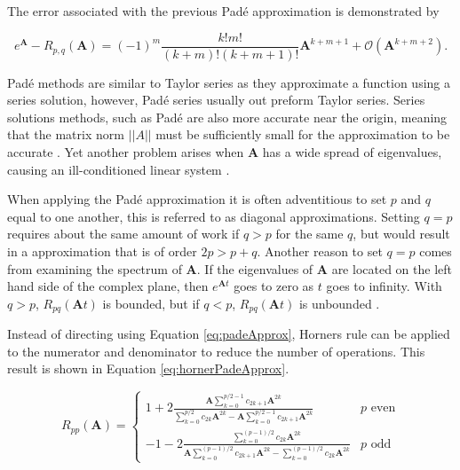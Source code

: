\noindent The error associated with the previous Pad\'e approximation is demonstrated by \cite{higham2005}

\begin{equation}
    e^{\boldsymbol{A}} - R_{p,q}(\boldsymbol{A}) = (-1)^{m}\frac{k!m!}{(k+m)!(k+m+1)!}\boldsymbol{A}^{k+m+1} + \mathcal{O}(\boldsymbol{A}^{k+m+2}).
\end{equation}

Pad\'e methods are similar to Taylor series as they approximate a function using a series solution, however, Pad\'e series usually out preform Taylor series. Series solutions methods, such as Pad\'e are also more accurate near the origin, meaning that the matrix norm $||A||$ must be sufficiently small for the approximation to be accurate \cite{pusa2010}. Yet another problem arises when $\boldsymbol{A}$ has a wide spread of eigenvalues, causing an ill-conditioned linear system  \cite{exokit} \cite{moler2003}.  

When applying the Pad\'e approximation it is often adventitious to set $p$ and $q$ equal to one another, this is referred to as diagonal approximations. Setting $q = p$ requires about the same amount of work if $q > p$ for the same $q$, but would result in a approximation that is of order $2p > p + q$. Another reason to set $q=p$ comes from examining the spectrum of $\boldsymbol{A}$. If the eigenvalues of $\boldsymbol{A}$ are located on the left hand side of the complex plane, then $e^{\boldsymbol{A}t}$ goes to zero as $t$ goes to infinity. With $q > p$, $R_{pq}(\boldsymbol{A}t)$ is bounded, but if $q < p$, $R_{pq}(\boldsymbol{A}t)$ is unbounded \cite{moler2003}. 


Instead of directing using Equation \ref{eq:padeApprox}, Horners rule can be applied to the numerator and denominator to reduce the number of operations. This result is shown in Equation \ref{eq:hornerPadeApprox}. 

\begin{equation}
    R_{pp}(\boldsymbol{A})=
    \begin{cases}
        1+2\frac{\boldsymbol{A}\sum_{k=0}^{p/2-1}c_{2k+1}\boldsymbol{A}^{2k}}{\sum_{k=0}^{p/2}c_{2k}\boldsymbol{A}^{2k}-\boldsymbol{A}\sum_{k=0}^{p/2-1}c_{2k+1}\boldsymbol{A}^{2k}} & p \text{ even}\\[1em]
        
        -1-2\frac{\sum_{k=0}^{(p-1)/2}c_{2k}\boldsymbol{A}^{2k}}{\boldsymbol{A}\sum_{k=0}^{(p-1)/2}c_{2k+1}\boldsymbol{A}^{2k}-\sum_{k=0}^{(p-1)/2}c_{2k}\boldsymbol{A}^{2k}} & p \text{ odd}
    \end{cases}
    \label{eq:hornerPadeApprox}
\end{equation}

